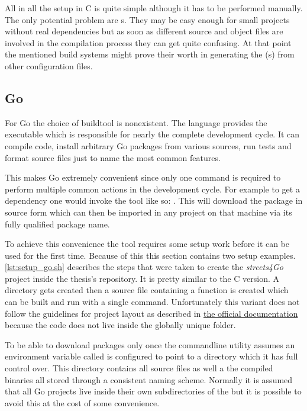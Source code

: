 All in all the setup in C is quite simple although it has to be performed manually. The only potential problem are s. They may be easy enough for small projects without real dependencies but as soon as different source and object files are involved in the compilation process they can get quite confusing. At that point the mentioned build systems might prove their worth in generating the (s) from other configuration files.

\subsection{Go}
\label{subsec:Implementation::Setup::Go}

For Go the choice of buildtool is nonexistent. The language provides the  executable which is responsible for nearly the complete development cycle. It can compile code, install arbitrary Go packages from various sources, run tests and format source files just to name the most common features.

This makes Go extremely convenient since only one command is required to perform multiple common actions in the development cycle. For example to get a dependency one would invoke the tool like so: . This will download the package in source form which can then be imported in any project on that machine via its fully qualified package name.

To achieve this convenience the  tool requires some setup work before it can be used for the first time. Because of this this section contains two setup examples.
\\


\autoref{lst:setup_go.sh} describes the steps that were taken to create the \textit{streets4Go} project inside the thesis's repository. It is pretty similar to the C version. A directory gets created then a source file containing a  function is created which can be built and run with a single command. Unfortunately this variant does not follow the guidelines for project layout as described in \href{https://golang.org/doc/code.html#Workspaces}{the official documentation} because the code does not live inside the globally unique  folder.

To be able to download packages only once the  commandline utility assumes an environment variable called  is configured to point to a directory which it has full control over. This directory contains all source files as well a the compiled binaries all stored through a consistent naming scheme. Normally it is assumed that all Go projects live inside their own subdirectories of the  but it is possible to avoid this at the cost of some convenience.

